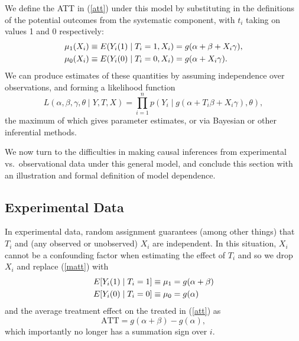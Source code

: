 \documentclass[11pt,titlepage]{article}
\begin{document}
We define the ATT in (\ref{att}) under this model by substituting in the
definitions of the potential outcomes from the systematic component,
with $t_i$ taking on values 1 and 0 respectively:
\begin{align}
  \label{matt}
\mu_1(X_i) &\equiv E(Y_i(1)\mid T_i=1,X_i)= g(\alpha + \beta + X_i\gamma),\notag \\
\mu_0(X_i) &\equiv E(Y_i(0)\mid T_i=0,X_i) = g(\alpha + X_i\gamma).
\end{align}
We can produce estimates of these quantities by assuming independence
over observations, and forming a likelihood function
\begin{equation}
  \label{lik}
  L(\alpha,\beta,\gamma,\theta\mid Y, T, X) = \prod_{i=1}^n 
  p\left(Y_i \mid g(\alpha + T_i\beta + X_i\gamma), \theta\right),
\end{equation}
the maximum of which gives parameter estimates, or via Bayesian or
other inferential methods.

We now turn to the difficulties in making causal inferences from
experimental vs.\ observational data under this general model, and
conclude this section with an illustration and formal definition of
model dependence.

\subsection{Experimental Data}\label{s:paraexp}

In experimental data, random assignment guarantees (among other
things) that $T_i$ and (any observed or unobserved) $X_i$ are
independent.  In this situation, $X_i$ cannot be a confounding factor
when estimating the effect of $T_i$ and so we drop $X_i$ and replace
(\ref{matt}) with
\begin{align}
  \label{smatt}
  E[Y_i(1)\mid T_i=1] &\equiv \mu_1 = g(\alpha + \beta)\notag \\
  E[Y_i(0)\mid T_i=0] &\equiv \mu_0 = g(\alpha)
\end{align}
and the average treatment effect on the treated in (\ref{att}) as
\begin{equation}
  \label{satt}
  \text{ATT} = g(\alpha+\beta) - g(\alpha),
\end{equation}
which importantly no longer has a summation sign over $i$.
\end{document}
